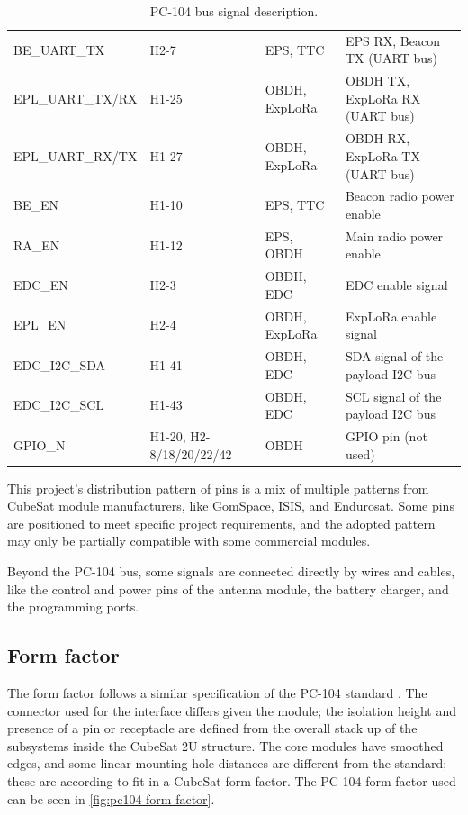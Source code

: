 \begin{table}[!ht]
\begin{tabular}{lL{0.18\textwidth}L{0.19\textwidth}L{0.33\textwidth}}
        BE\_UART\_TX     & H2-7            & \ac{EPS}, \ac{TTC}             & \ac{EPS} RX, Beacon TX (UART bus) \\
        EPL\_UART\_TX/RX & H1-25           & \ac{OBDH}, ExpLoRa        & \ac{OBDH} TX, ExpLoRa RX (UART bus) \\
        EPL\_UART\_RX/TX & H1-27           & \ac{OBDH}, ExpLoRa        & \ac{OBDH} RX, ExpLoRa TX (UART bus) \\
        BE\_EN           & H1-10           & \ac{EPS}, \ac{TTC}             & Beacon radio power enable \\
        RA\_EN           & H1-12           & \ac{EPS}, \ac{OBDH}            & Main radio power enable \\
        EDC\_EN          & H2-3            & \ac{OBDH}, \ac{EDC}            & \ac{EDC} enable signal \\
        EPL\_EN          & H2-4            & \ac{OBDH}, ExpLoRa        & ExpLoRa enable signal \\
        EDC\_I2C\_SDA    & H1-41           & \ac{OBDH}, \ac{EDC}            & SDA signal of the payload I2C bus \\
        EDC\_I2C\_SCL    & H1-43           & \ac{OBDH}, \ac{EDC}            & SCL signal of the payload I2C bus \\
        GPIO\_N          & H1-20, H2-8/18/20/22/42  & \ac{OBDH}        & GPIO pin (not used) \\
        \bottomrule[1.5pt]
    \end{tabular}
    \caption{PC-104 bus signal description.}
    \label{tab:pc104-signals}
\end{table}

This project's distribution pattern of pins is a mix of multiple patterns from CubeSat module manufacturers, like GomSpace, ISIS, and Endurosat. Some pins are positioned to meet specific project requirements, and the adopted pattern may only be partially compatible with some commercial modules.

Beyond the PC-104 bus, some signals are connected directly by wires and cables, like the control and power pins of the antenna module, the battery charger, and the programming ports.

\subsection{Form factor}

The form factor follows a similar specification of the PC-104 standard \cite{pc104-specification}.
The connector used for the interface differs given the module; the isolation height and presence of a pin or receptacle are defined from the overall stack up of the subsystems inside the CubeSat 2U structure.
The core modules have smoothed edges, and some linear mounting hole distances are different from the standard; these are according to fit in a CubeSat form factor.
The PC-104 form factor used can be seen in \autoref{fig:pc104-form-factor}.

